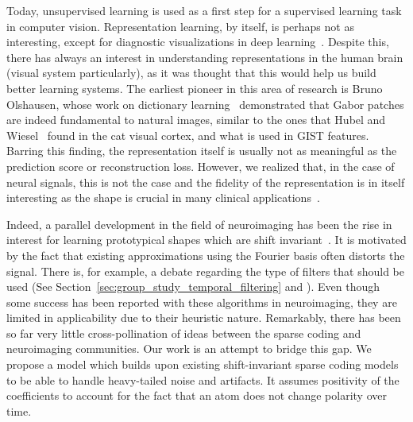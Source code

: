 Today, unsupervised learning is used as a first step for a supervised learning task in computer vision. Representation learning, by itself, is perhaps not as interesting, except for diagnostic visualizations in deep learning~\citep{zeiler2014visualizing}. Despite this, there has always an interest in understanding representations in the human brain (visual system particularly), as it was thought that this would help us build better learning systems. The earliest pioneer in this area of research is Bruno Olshausen, whose work on dictionary learning~\citep{olshausen1996emergence} demonstrated that Gabor patches are indeed fundamental to natural images, similar to the ones that Hubel and Wiesel~\citep{hubel1962receptive, marcelja1980mathematical} found in the cat visual cortex, and what is used in GIST features. Barring this finding, the representation itself is usually not as meaningful as the prediction score or reconstruction loss. However, we realized that, in the case of neural signals, this is not the case and the fidelity of the representation is in itself interesting as the shape is crucial in many clinical applications~\citep{cole2017brain}. 

Indeed, a parallel development in the field of neuroimaging has been the rise in interest for learning prototypical shapes which are shift invariant~\citep{jost2006motif, barthelemy2013multivariate, brockmeier2016learning, hitziger2017adaptive}. It is motivated by the fact that existing approximations using the Fourier basis often distorts the signal. There is, for example, a debate regarding the type of filters that should be used (See Section~\ref{sec:group_study_temporal_filtering} and \cite{widmann2015digital,parks1987digital,ifeachor2002digital, gotz-etal:15}). 
Even though some success has been reported
with these algorithms in neuroimaging, they are limited in applicability due to their heuristic nature.
Remarkably, there has been so far very little cross-pollination of ideas between the sparse coding and neuroimaging communities. 
Our work is an attempt to bridge this gap. 
We propose a model which builds upon existing shift-invariant sparse coding models to be able to handle heavy-tailed noise and artifacts. It assumes positivity of the coefficients to account for the fact that an atom does not change polarity over time. 

